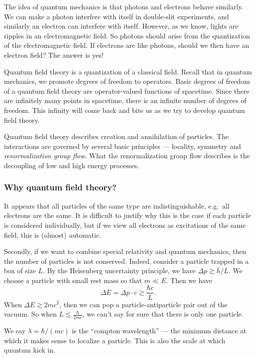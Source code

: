 \documentclass[a4paper]{article}
\begin{document}
The idea of quantum mechanics is that photons and electrons behave similarly. We can make a photon interfere with itself in double-slit experiments, and similarly an electron can interfere with itself. However, as we know, lights are ripples in an electromagnetic field. So photons should arise from the quantization of the electromagnetic field. If electrons are like photons, should we then have an electron field? The answer is yes!

Quantum field theory is a quantization of a classical field. Recall that in quantum mechanics, we promote degrees of freedom to operators. Basic degrees of freedom of a quantum field theory are operator-valued functions of spacetime. Since there are infinitely many points in spacetime, there is an infinite number of degrees of freedom. This infinity will come back and bite us as we try to develop quantum field theory.

Quantum field theory describes creation and annihilation of particles. The interactions are governed by several basic principles --- locality, symmetry and \emph{renormalization group flow}. What the renormalization group flow describes is the decoupling of low and high energy processes.

\subsubsection*{Why quantum field theory?}
It appears that all particles of the same type are indistinguishable, e.g.\ all electrons are the same. It is difficult to justify why this is the case if each particle is considered individually, but if we view all electrons as excitations of the same field, this is (almost) automatic.

Secondly, if we want to combine special relativity and quantum mechanics, then the number of particles is not conserved. Indeed, consider a particle trapped in a box of size $L$. By the Heisenberg uncertainty principle, we have $\Delta p \gtrsim \bar{h}/L$. We choose a particle with small rest mass so that $m \ll E$. Then we have
\[
  \Delta E = \Delta p \cdot c \gtrsim \frac{\hbar c}{L}.
\]
When $\Delta E \gtrsim 2 mc^2$, then we can pop a particle-antiparticle pair out of the vacuum. So when $L \lesssim \frac{\hbar}{2mc}$, we can't say for sure that there is only one particle.

We say $\lambda = \hbar/(mc)$ is the ``compton wavelength'' --- the minimum distance at which it makes sense to localize a particle. This is also the scale at which quantum kick in.
\end{document}
